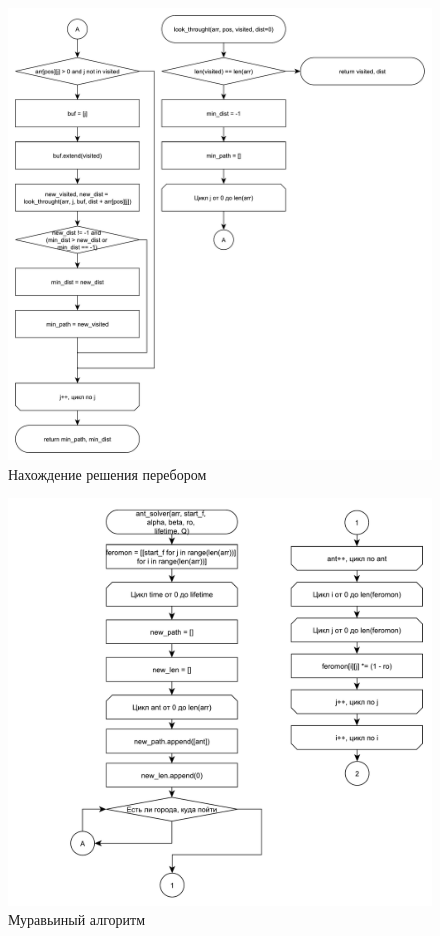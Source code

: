 \documentclass[main.tex]{subfiles}
\begin{document}
	\begin{figure}[H]
		\centering
		\includegraphics[scale=0.5]{src/img/1.1}
		\caption{Нахождение решения перебором}
		\label{fig:1.1}
	\end{figure}

	\begin{figure}[H]
		\centering
		\includegraphics[scale=0.5]{src/img/2.pdf}
		\caption{Муравьиный алгоритм}
		\label{fig:2}
	\end{figure}
\end{document}
